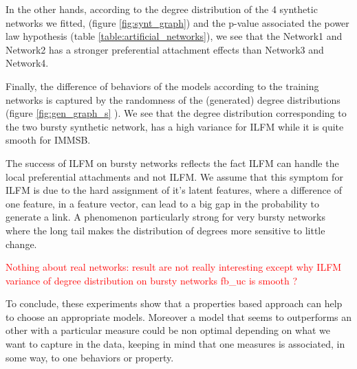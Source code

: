 In the other hands, according to the degree distribution of the 4 synthetic networks we fitted, (figure \ref{fig:synt_graph}) and the p-value associated the power law hypothesis (table \ref{table:artificial_networks}), we see that the Network1 and Network2 has a stronger preferential attachment effects than Network3 and Network4.


Finally, the difference of behaviors of the models according to the training networks is captured by the randomness of the (generated) degree distributions (figure \ref{fig:gen_graph_s} ). We see that the degree distribution corresponding to the two bursty synthetic network, has  a high variance for ILFM while it is quite smooth for IMMSB.

The success of ILFM on bursty networks reflects the fact ILFM can handle the local preferential attachments and not ILFM. We assume that this symptom for ILFM is due to the hard assignment of it's latent features, where a difference of one feature, in a feature vector, can lead to a big gap in the probability to generate a link. A phenomenon particularly strong for very bursty networks where the long tail makes the distribution of degrees more sensitive to little change.

\textcolor{red}{Nothing about real networks: result are not really interesting except why ILFM variance of degree distribution on bursty networks fb\_uc is smooth ? }

To conclude, these experiments show that a properties based approach can help to choose an appropriate models. Moreover a model that seems to outperforms an other with a particular measure could be non optimal depending on what we want to capture in the data, keeping in mind that one measures is associated, in some way, to one behaviors or property.
